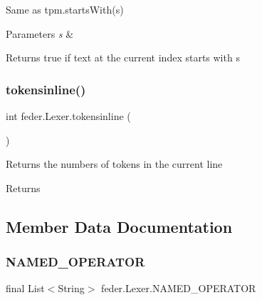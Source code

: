 Same as tpm.\+starts\+With(s) 
\begin{DoxyParams}{Parameters}
{\em s} & \\
\hline
\end{DoxyParams}
\begin{DoxyReturn}{Returns}
true if text at the current index starts with \textquotesingle{}s\textquotesingle{} 
\end{DoxyReturn}
\mbox{\label{classfeder_1_1Lexer_a4278e0e494f8a716e69bc9d24834da19}} 
\subsubsection{\texorpdfstring{tokensinline()}{tokensinline()}}
{\footnotesize\ttfamily int feder.\+Lexer.\+tokensinline (\begin{DoxyParamCaption}{ }\end{DoxyParamCaption})}

Returns the numbers of tokens in the current line \begin{DoxyReturn}{Returns}

\end{DoxyReturn}


\subsection{Member Data Documentation}
\mbox{\label{classfeder_1_1Lexer_a0e0ebb5336f19210156b0cb6e146c2b3}} 
\subsubsection{\texorpdfstring{N\+A\+M\+E\+D\+\_\+\+O\+P\+E\+R\+A\+T\+OR}{NAMED\_OPERATOR}}
{\footnotesize\ttfamily final List$<$String$>$ feder.\+Lexer.\+N\+A\+M\+E\+D\+\_\+\+O\+P\+E\+R\+A\+T\+OR\hspace{0.3cm}{\ttfamily [static]}}

